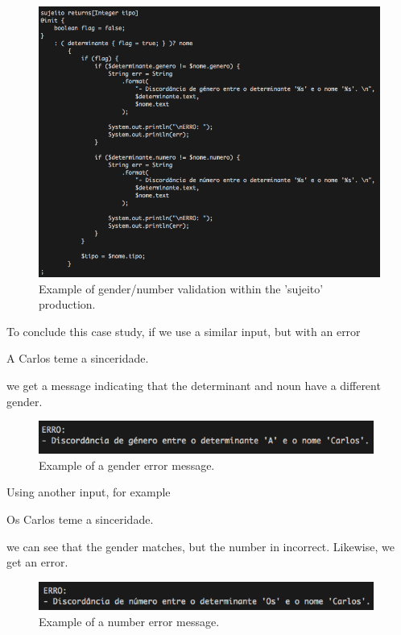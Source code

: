 \begin{figure}[h]
    \centering
    \includegraphics[width=13cm]{images/dsl_GenderNumber_validation.png}
    \caption{Example of gender/number validation within the 'sujeito' production.}
    \label{fig:sujeito_dsl_excerpt}
\end{figure}

To conclude this case study, if we use a similar input, but with an error
\begin{description}
    A Carlos teme a sinceridade.
\end{description}
we get a message indicating that the determinant and noun have a different gender.

\begin{figure}[h]
    \centering
    \includegraphics[width=11cm]{images/dsl_gender_error.png}
    \caption{Example of a gender error message.}
    \label{fig:erro_gender_dsl_excerpt}
\end{figure}

\noindent Using another input, for example
\begin{description}
    Os Carlos teme a sinceridade.
\end{description}
we can see that the gender matches, but the number in incorrect. Likewise, we get an error.

\begin{figure}[h]
    \centering
    \includegraphics[width=11cm]{images/dsl_number_error.png}
    \caption{Example of a number error message.}
    \label{fig:erro_number_dsl_excerpt}
\end{figure}